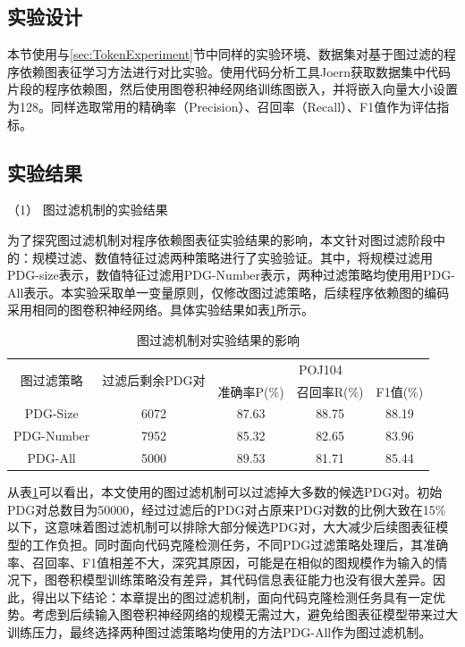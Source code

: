 \subsection{实验设计}
\label{sec:PDGDesign}

本节使用与\ref{sec:TokenExperiment}节中同样的实验环境、数据集对基于图过滤的程序依赖图表征学习方法进行对比实验。使用代码分析工具Joern获取数据集中代码片段的程序依赖图，然后使用图卷积神经网络训练图嵌入，并将嵌入向量大小设置为128。同样选取常用的精确率（Precision）、召回率（Recall）、F1值作为评估指标。

\subsection{实验结果}
\label{subsec:PDGResult}

（1） 图过滤机制的实验结果

为了探究图过滤机制对程序依赖图表征实验结果的影响，本文针对图过滤阶段中的：规模过滤、数值特征过滤两种策略进行了实验验证。其中，将规模过滤用PDG-size表示，数值特征过滤用PDG-Number表示，两种过滤策略均使用用PDG-All表示。本实验采取单一变量原则，仅修改图过滤策略，后续程序依赖图的编码采用相同的图卷积神经网络。具体实验结果如表\ref{tab:graph}所示。

\begin{table}[htp]
  \centering
  \caption{图过滤机制对实验结果的影响} 
  \label{tab:graph}
  \begin{tabular*}{0.9\textwidth}{@{\extracolsep{\fill}}ccccc}
  \toprule
   \multirow{2}{*}{图过滤策略} & \multirow{2}{*}{过滤后剩余PDG对} & \multicolumn{3}{c}{POJ104} \\
  \cmidrule{3-5} 
   & & 准确率P(\%) & 召回率R(\%) & F1值(\%)  \\ 
  \midrule
    PDG-Size		   & 6072	  &87.63	 &88.75		&88.19 \\
    PDG-Number		 & 7952	  &85.32   &82.65   &83.96 \\
    PDG-All		     & 5000	  &89.53   &81.71	 &85.44 \\
  \bottomrule
  \end{tabular*}
\end{table}

从表\ref{tab:graph}可以看出，本文使用的图过滤机制可以过滤掉大多数的候选PDG对。初始PDG对总数目为50000，经过过滤后的PDG对占原来PDG对数的比例大致在15\%以下，这意味着图过滤机制可以排除大部分候选PDG对，大大减少后续图表征模型的工作负担。同时面向代码克隆检测任务，不同PDG过滤策略处理后，其准确率、召回率、F1值相差不大，深究其原因，可能是在相似的图规模作为输入的情况下，图卷积模型训练策略没有差异，其代码信息表征能力也没有很大差异。因此，得出以下结论：本章提出的图过滤机制，面向代码克隆检测任务具有一定优势。考虑到后续输入图卷积神经网络的规模无需过大，避免给图表征模型带来过大训练压力，最终选择两种图过滤策略均使用的方法PDG-All作为图过滤机制。

